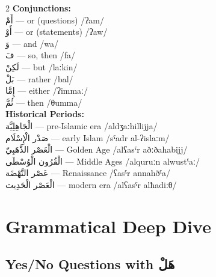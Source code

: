 \documentclass[letterpaper,12pt]{article}
\begin{document}
\begin{multicols}{2}
\textbf{Conjunctions:}\\
\textarabic{أَمْ} — or (questions) /ʔam/\\
\textarabic{أَوْ} — or (statements) /ʔaw/\\
\textarabic{وَ} — and /wa/\\
\textarabic{فَ} — so, then /fa/\\
\textarabic{لَكِنْ} — but /laːkin/\\
\textarabic{بَلْ} — rather /bal/\\
\textarabic{إِمَّا} — either /ʔimmaː/\\
\textarabic{ثُمَّ} — then /θumma/\\

\textbf{Historical Periods:}\\
\textarabic{الْجَاهِلِيَّة} — pre-Islamic era /aldʒaːhillijja/\\
\textarabic{صَدْر الْإِسْلَام} — early Islam /sˤadr al-ʔislaːm/\\
\textarabic{الْعَصْر الذَّهَبِيّ} — Golden Age /alʕasˤr aðːðahabijj/\\
\textarabic{الْقُرُون الْوُسْطَى} — Middle Ages /alquruːn alwustˤaː/\\
\textarabic{عَصْر النَّهْضَة} — Renaissance /ʕasˤr annahðˤa/\\
\textarabic{الْعَصْر الْحَدِيث} — modern era /alʕasˤr alħadiːθ/\\
\end{multicols}

\section{Grammatical Deep Dive}

\subsection{Yes/No Questions with \textarabic{هَلْ}}
\end{document}
